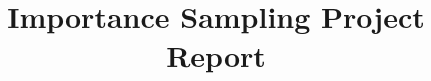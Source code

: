 \documentclass[conference,compsoc]{IEEEtran}
\begin{document}
%
\title{Importance Sampling Project Report}


\author{
\IEEEauthorblockA{}
\and
{}
\IEEEauthorblockA{}
\and
{}
\IEEEauthorblockA{}}


% 





\maketitle
\end{document}
